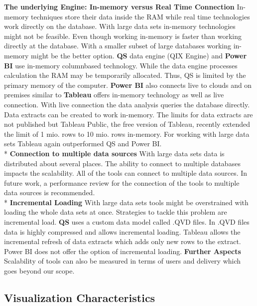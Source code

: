 \textbf{The underlying Engine: In-memory versus Real Time Connection}
In-memory techniques store their data inside the RAM while real time technologies work directly on the database.
With large data sets in-memory technologies might not be feasible. Even though working in-memory is faster than working directly at the database. With a smaller subset of large databases working in-memory might be the better option. 
\textbf{QS} data engine (QIX Engine) and \textbf{Power BI} use in-memory columnbased technology. While the data engine processes calculation the RAM may be temporarily allocated. Thus, QS is limited by the primary memory of the computer. \textbf{Power BI} also connects live to clouds and on premises similar to \textbf{Tableau} offers in-memory technology as well as live connection. With live connection the data analysis queries the database directly. Data extracts can be created to work in-memory. The limits for data extracts are not published but Tableau Public, the free version of Tableau, recently extended the limit of 1 mio. rows to 10 mio. rows in-memory. 
For working with large data sets Tableau again outperformed QS and Power BI.\\*
\textbf{Connection to multiple data sources}
With large data sets data is distributed about several places. The ability to connect to multiple databases impacts the scalability. All of the tools can connect to multiple data sources. In future work, a performance review for the connection of the tools to multiple data sources is recommended.\\*
\textbf{Incremental Loading}
With large data sets tools might be overstrained with loading the whole data sets at once. Strategies to tackle this problem are incremental load. \textbf{QS} uses a custom data model called .QVD files. In .QVD files data is highly compressed and allows incremental loading. Tableau allows the incremental refresh of data extracts which adds only new rows to the extract. Power BI does not offer the option of incremental loading. 
\textbf{Further Aspects}
Scalability of tools can also be measured in terms of users and delivery which goes beyond our scope.




\subsection{Visualization Characteristics}

